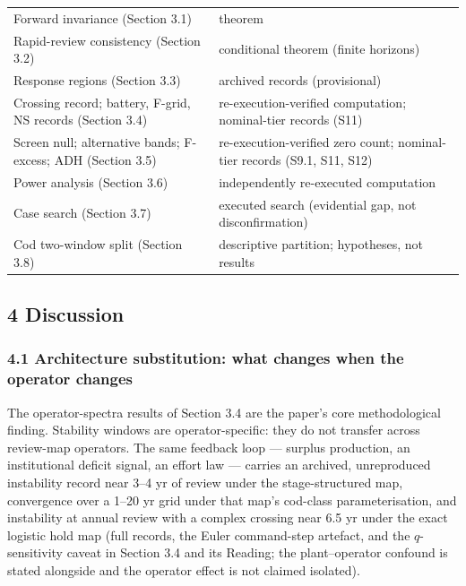\documentclass[11pt]{article}
\begin{document}
\begin{longtable}[]{@{}
  >{\raggedright\arraybackslash}p{}
  >{\raggedright\arraybackslash}p{}@{}}
\toprule\noalign{}
\endhead
\bottomrule\noalign{}
\endlastfoot
Forward invariance (Section 3.1) & theorem \\
Rapid-review consistency (Section 3.2) & conditional theorem (finite horizons) \\
Response regions (Section 3.3) & archived records (provisional) \\
Crossing record; battery, F-grid, NS records (Section 3.4) & re-execution-verified computation; nominal-tier records (S11) \\
Screen null; alternative bands; F-excess; ADH (Section 3.5) & re-execution-verified zero count; nominal-tier records (S9.1, S11, S12) \\
Power analysis (Section 3.6) & independently re-executed computation \\
Case search (Section 3.7) & executed search (evidential gap, not disconfirmation) \\
Cod two-window split (Section 3.8) & descriptive partition; hypotheses, not results \\
\end{longtable}

\subsection{4 Discussion}\label{discussion}

\subsubsection{4.1 Architecture substitution: what changes when the
operator
changes}\label{architecture-substitution-what-changes-when-the-operator-changes}

The operator-spectra results of Section 3.4 are the paper's core methodological finding. Stability windows are operator-specific: they do not transfer across review-map operators. The same feedback loop --- surplus production,
an institutional deficit signal, an effort law --- carries an archived,
unreproduced instability record near 3--4 yr of review under the
stage-structured map, convergence over a 1--20 yr grid under that map's
cod-class parameterisation, and instability at annual review with a
complex crossing near 6.5 yr under the exact logistic hold map (full
records, the Euler command-step artefact, and the \(q\)-sensitivity
caveat in Section 3.4 and its Reading; the plant--operator confound is
stated alongside and the operator effect is not claimed isolated).
\end{document}
